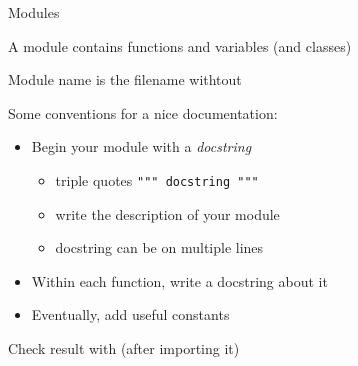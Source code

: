 \begin{frame}[fragile]{Modules}

  A module contains functions and variables (and classes)

  \medskip

   Module name is the filename withtout 

  \medskip

   Some conventions for a nice documentation:

  \begin{itemize}
    \item<3-> Begin your module with a \textit{docstring}
    \begin{itemize}
      \item triple quotes \lstinline|""" docstring """|
      \item write the description of your module
      \item docstring can be on multiple lines
    \end{itemize}
    \item<4-> Within each function, write a docstring about it
    \item<5-> Eventually, add useful constants
  \end{itemize}

  \bigskip

   Check result with  (after importing it)

\end{frame}


